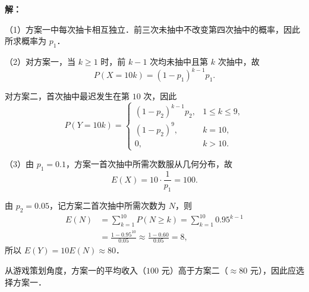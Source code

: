 \documentclass[a4paper,12pt]{ctexart}
\begin{document}
\textbf{解：}

（1）方案一中每次抽卡相互独立．前三次未抽中不改变第四次抽中的概率，因此所求概率为 $p_{1}$．

（2）对方案一，当 $k \geqslant 1$ 时，前 $k - 1$ 次均未抽中且第 $k$ 次抽中，故
\[
P(X = 10k) = (1 - p_{1})^{k-1} p_{1}.
\]

对方案二，首次抽中最迟发生在第 $10$ 次，因此
\[
P(Y = 10k) =
\begin{cases}
(1 - p_{2})^{k-1} p_{2}, & 1 \leqslant k \leqslant 9, \\[4pt]
(1 - p_{2})^{9},          & k = 10, \\[4pt]
0,                        & k > 10.
\end{cases}
\]

（3）由 $p_{1} = 0.1$，方案一首次抽中所需次数服从几何分布，故
\[
E(X) = 10 \cdot \frac{1}{p_{1}} = 100.
\]

由 $p_{2} = 0.05$，记方案二首次抽中所需次数为 $N$，则
\begin{align*}
E(N) &= \sum_{k=1}^{10} P(N \geqslant k)
      = \sum_{k=1}^{10} 0.95^{k-1} \\[4pt]
     &= \frac{1 - 0.95^{10}}{0.05}
      \approx \frac{1 - 0.60}{0.05}
      = 8,
\end{align*}
所以 $E(Y) = 10 E(N) \approx 80$．

从游戏策划角度，方案一的平均收入（$100$ 元）高于方案二（$\approx 80$ 元），因此应选择方案一．
\end{document}
